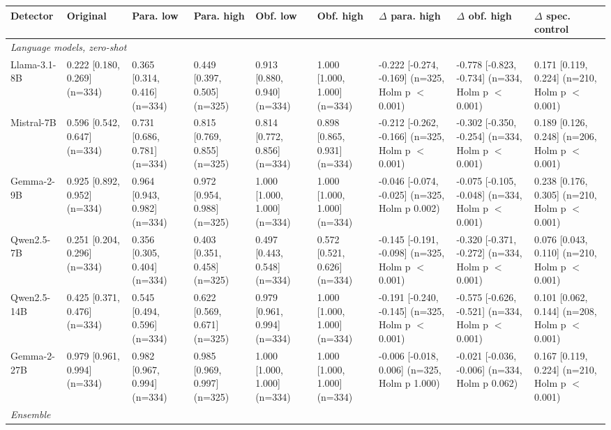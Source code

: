 \begin{tabular}{lllllllll}
\toprule
Detector & Original & Para. low & Para. high & Obf. low & Obf. high & $\Delta$ para. high & $\Delta$ obf. high & $\Delta$ spec. control \\
\midrule
\multicolumn{9}{l}{\textit{Language models, zero-shot}} \\
Llama-3.1-8B & 0.222 [0.180, 0.269] (n=334) & 0.365 [0.314, 0.416] (n=334) & 0.449 [0.397, 0.505] (n=325) & 0.913 [0.880, 0.940] (n=334) & 1.000 [1.000, 1.000] (n=334) & -0.222 [-0.274, -0.169] (n=325, Holm p $<$0.001) & -0.778 [-0.823, -0.734] (n=334, Holm p $<$0.001) & 0.171 [0.119, 0.224] (n=210, Holm p $<$0.001) \\
Mistral-7B & 0.596 [0.542, 0.647] (n=334) & 0.731 [0.686, 0.781] (n=334) & 0.815 [0.769, 0.855] (n=325) & 0.814 [0.772, 0.856] (n=334) & 0.898 [0.865, 0.931] (n=334) & -0.212 [-0.262, -0.166] (n=325, Holm p $<$0.001) & -0.302 [-0.350, -0.254] (n=334, Holm p $<$0.001) & 0.189 [0.126, 0.248] (n=206, Holm p $<$0.001) \\
Gemma-2-9B & 0.925 [0.892, 0.952] (n=334) & 0.964 [0.943, 0.982] (n=334) & 0.972 [0.954, 0.988] (n=325) & 1.000 [1.000, 1.000] (n=334) & 1.000 [1.000, 1.000] (n=334) & -0.046 [-0.074, -0.025] (n=325, Holm p 0.002) & -0.075 [-0.105, -0.048] (n=334, Holm p $<$0.001) & 0.238 [0.176, 0.305] (n=210, Holm p $<$0.001) \\
Qwen2.5-7B & 0.251 [0.204, 0.296] (n=334) & 0.356 [0.305, 0.404] (n=334) & 0.403 [0.351, 0.458] (n=325) & 0.497 [0.443, 0.548] (n=334) & 0.572 [0.521, 0.626] (n=334) & -0.145 [-0.191, -0.098] (n=325, Holm p $<$0.001) & -0.320 [-0.371, -0.272] (n=334, Holm p $<$0.001) & 0.076 [0.043, 0.110] (n=210, Holm p $<$0.001) \\
Qwen2.5-14B & 0.425 [0.371, 0.476] (n=334) & 0.545 [0.494, 0.596] (n=334) & 0.622 [0.569, 0.671] (n=325) & 0.979 [0.961, 0.994] (n=334) & 1.000 [1.000, 1.000] (n=334) & -0.191 [-0.240, -0.145] (n=325, Holm p $<$0.001) & -0.575 [-0.626, -0.521] (n=334, Holm p $<$0.001) & 0.101 [0.062, 0.144] (n=208, Holm p $<$0.001) \\
Gemma-2-27B & 0.979 [0.961, 0.994] (n=334) & 0.982 [0.967, 0.994] (n=334) & 0.985 [0.969, 0.997] (n=325) & 1.000 [1.000, 1.000] (n=334) & 1.000 [1.000, 1.000] (n=334) & -0.006 [-0.018, 0.006] (n=325, Holm p 1.000) & -0.021 [-0.036, -0.006] (n=334, Holm p 0.062) & 0.167 [0.119, 0.224] (n=210, Holm p $<$0.001) \\
\midrule
\multicolumn{9}{l}{\textit{Ensemble}} \\

\end{tabular}
